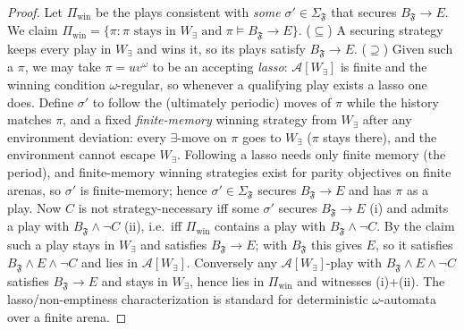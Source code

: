 \documentclass[11pt]{article}
\theoremstyle{remark}
\newcommand{\Frame}{\mathfrak{F}}
\begin{document}
\begin{proof}
Let \(\Pi_{\mathrm{win}}\) be the plays consistent with \emph{some}
\(\sigma'\in\Sigma_{\Frame}\) that secures \(B_{\Frame}\rightarrow E\). We claim
\(\Pi_{\mathrm{win}}=\{\pi:\pi\text{ stays in }W_\exists\text{ and }\pi\models
B_{\Frame}\rightarrow E\}\). (\(\subseteq\)) A securing strategy keeps every play
in \(W_\exists\) and wins it, so its plays satisfy \(B_{\Frame}\rightarrow E\).
(\(\supseteq\)) Given such a \(\pi\), we may take \(\pi=uv^\omega\) to be an
accepting \emph{lasso}: \(\mathcal{A}[W_\exists]\) is finite and the winning
condition \(\omega\)-regular, so whenever a qualifying play exists a lasso one does.
Define \(\sigma'\) to follow the (ultimately periodic) moves of \(\pi\)
while the history matches \(\pi\), and a fixed \emph{finite-memory} winning strategy
from \(W_\exists\)
after any environment deviation: every \(\exists\)-move on \(\pi\) goes to
\(W_\exists\) (\(\pi\) stays there), and the environment cannot escape
\(W_\exists\). Following a lasso needs only finite memory (the period), and
finite-memory winning strategies exist for parity objectives on finite arenas, so
\(\sigma'\) is finite-memory; hence \(\sigma'\in\Sigma_{\Frame}\) secures
\(B_{\Frame}\rightarrow E\) and has \(\pi\) as a play. Now \(C\) is not strategy-necessary iff some
\(\sigma'\) secures \(B_{\Frame}\rightarrow E\) (i) and admits a play with
\(B_{\Frame}\wedge\neg C\) (ii), i.e.\ iff \(\Pi_{\mathrm{win}}\) contains a play
with \(B_{\Frame}\wedge\neg C\). By the claim such a play stays in \(W_\exists\)
and satisfies \(B_{\Frame}\rightarrow E\); with \(B_{\Frame}\) this gives \(E\), so
it satisfies \(B_{\Frame}\wedge E\wedge\neg C\) and lies in
\(\mathcal{A}[W_\exists]\). Conversely any \(\mathcal{A}[W_\exists]\)-play with
\(B_{\Frame}\wedge E\wedge\neg C\) satisfies \(B_{\Frame}\rightarrow E\) and stays
in \(W_\exists\), hence lies in \(\Pi_{\mathrm{win}}\) and witnesses (i)+(ii). The
lasso/non-emptiness characterization is standard for deterministic
\(\omega\)-automata over a finite arena.
\end{proof}
\end{document}
